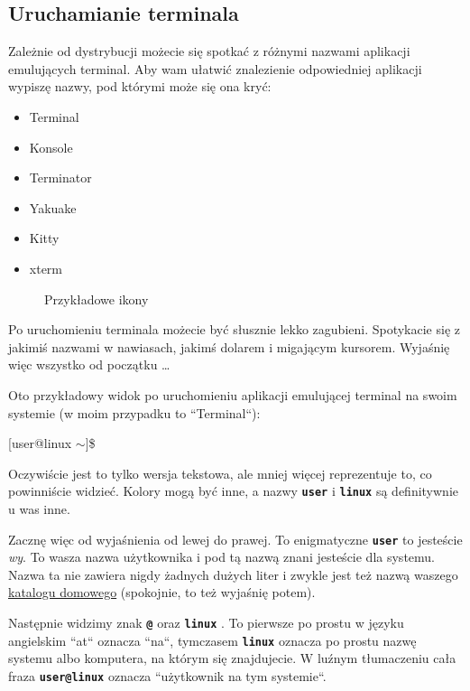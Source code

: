 \documentclass[12pt]{article}
\makeatletter
\newcommand{\ttbf}[1]{
    \texttt{\textbf{#1}}
}
\newenvironment{console1}
{
    \ttfamily
    \fontseries{b}
    \selectfont
    {[}user@linux $\sim${]}\$} {

    }
\makeatother
\begin{document}
\subsection{Uruchamianie terminala}

Zależnie od dystrybucji możecie się spotkać z różnymi nazwami aplikacji emulujących terminal. Aby wam ułatwić znalezienie odpowiedniej aplikacji wypiszę nazwy, pod którymi może się ona kryć:

\begin{itemize}
    \item Terminal
    \item Konsole
    \item Terminator
    \item Yakuake
    \item Kitty
    \item xterm
\end{itemize}

\begin{figure}[H]
    \centering
    \quad
    \subfloat['Konsole']{}
    \caption{Przykładowe ikony}
\end{figure}

Po uruchomieniu terminala możecie być słusznie lekko zagubieni. Spotykacie się z jakimiś nazwami w nawiasach, jakimś dolarem i migającym kursorem. Wyjaśnię więc wszystko od początku \dots

Oto przykładowy widok po uruchomieniu aplikacji emulującej terminal na swoim systemie (w moim przypadku to ``Terminal``):

\begin{console1}

\end{console1}

Oczywiście jest to tylko wersja tekstowa, ale mniej więcej reprezentuje to, co powinniście widzieć. Kolory mogą być inne, a nazwy \ttbf{user} i \ttbf{linux} są definitywnie u was inne.

Zacznę więc od wyjaśnienia od lewej do prawej. To enigmatyczne \ttbf{user} to jesteście \emph{wy}. To wasza nazwa użytkownika i pod tą nazwą znani jesteście dla systemu. Nazwa ta nie zawiera nigdy żadnych dużych liter i zwykle jest też nazwą waszego \hyperref[sec:homedir]{katalogu domowego} (spokojnie, to też wyjaśnię potem).

Następnie widzimy znak \ttbf{@} oraz \ttbf{linux}. To pierwsze po prostu w języku angielskim ``at`` oznacza ``na``, tymczasem \ttbf{linux} oznacza po prostu nazwę systemu albo komputera, na którym się znajdujecie. W luźnym tłumaczeniu cała fraza \ttbf{user@linux} oznacza ``użytkownik na tym systemie``.
\end{document}
